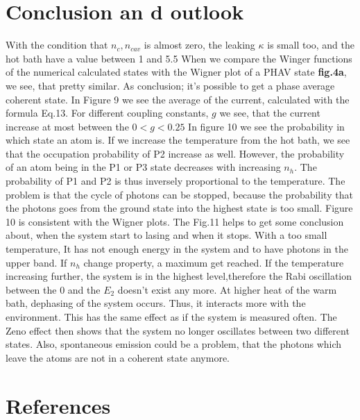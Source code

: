 \documentclass[12pt,a4paper]{article}
\begin{document}
\section{Conclusion an d outlook}
With the condition that $n_c, n_{cav}$ is almost zero, the leaking $\kappa$ is small too, and the hot bath have a value between 1 and 5.5 When we compare the Winger functions of the numerical calculated states with the Wigner plot of a PHAV state \textbf{fig.4a}, we see, that pretty similar. As conclusion; it's possible to get a phase average coherent state. 
In Figure 9 we see the average of the current, calculated with the formula Eq.13.  For different coupling constants, $g$
we see, that the current increase at most between the $ 0<g<0.25$ 
In figure 10 we see the probability in which state an atom is. If we increase the temperature from the hot bath, we see that the occupation probability of P2 increase as well. However, the probability of an atom being in the P1 or P3 state decreases with increasing $n_h$. The probability of P1 and P2 is thus inversely proportional to the temperature.
The problem is that the cycle of photons can be stopped, because the probability that the photons goes from the ground state into the highest state is too small.
Figure 10 is consistent with the Wigner plots.
The Fig.11 helps to get some conclusion about, when the system start to lasing and when it stops. With a too small temperature, It has not enough energy in the system and to have photons in the upper band. If $n_h$ change property, a maximum get reached. If the temperature increasing further, the system is in the highest level,therefore the Rabi oscillation between the 0 and the $E_2$ doesn't exist any more.
At higher heat of the warm bath, dephasing of the system occurs. Thus, it interacts more with the environment. This has the same effect as if the system is measured often. The Zeno effect then shows that the system no longer oscillates between two different states. Also, spontaneous  emission could be a problem, that the photons which leave the atoms are not in a coherent state anymore. \cite{Niedenzu2019}
\cite{Scovil1959}
\section{References}
\printbibliography[title={Whole bibliography}]



\newpage
\end{document}

